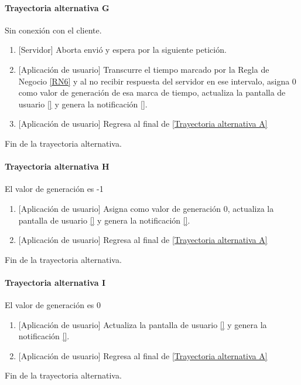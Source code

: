 \paragraph{Trayectoria alternativa G} \label{SUB-M-CU5:TG}
	Sin conexión con el cliente.
	\begin{enumerate}[label=G\arabic*.]
		\item {[Servidor]} Aborta envió y espera por la siguiente petición.
		\item {[Aplicación de usuario]} Transcurre el tiempo marcado por la Regla de Negocio \ref{RN6} y al no recibir respuesta del servidor en ese intervalo, asigna 0 como valor de generación de esa marca de tiempo, actualiza la pantalla de usuario \ref{} y genera la notificación \ref{}.
		\item {[Aplicación de usuario]} Regresa al final de \hyperref[SUB-M-CU5:TA]{[Trayectoria alternativa A]}
	\end{enumerate}
	Fin de la trayectoria alternativa.
	
\paragraph{Trayectoria alternativa H} \label{SUB-M-CU5:TH}
	El valor de generación es -1
	\begin{enumerate}[label=H\arabic*.]
		\item {[Aplicación de usuario]} Asigna como valor de generación 0, actualiza la pantalla de usuario \ref{} y genera la notificación \ref{}.
		\item {[Aplicación de usuario]} Regresa al final de \hyperref[SUB-M-CU5:TA]{[Trayectoria alternativa A]}
	\end{enumerate}
	Fin de la trayectoria alternativa.
	
\paragraph{Trayectoria alternativa I} \label{SUB-M-CU5:TI}
	El valor de generación es 0
	\begin{enumerate}[label=I\arabic*.]
		\item {[Aplicación de usuario]}  Actualiza la pantalla de usuario \ref{} y genera la notificación \ref{}.
		\item {[Aplicación de usuario]} Regresa al final de \hyperref[SUB-M-CU5:TA]{[Trayectoria alternativa A]}
	\end{enumerate}
	Fin de la trayectoria alternativa.